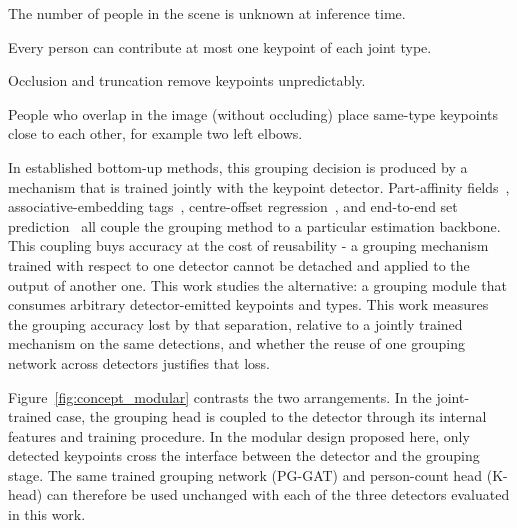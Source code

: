 \begin{compactitem}
    \item The number of people in the scene is unknown at inference time.
    \item Every person can contribute at most one keypoint of each joint type.
    \item Occlusion and truncation remove keypoints unpredictably.
    \item People who overlap in the image (without occluding) place same-type keypoints
    close to each other, for example two left elbows.
\end{compactitem}

In established bottom-up methods, this grouping decision is produced by a mechanism
that is trained jointly with the keypoint detector. Part-affinity fields~\cite{cao2017openpose},
associative-embedding tags~\cite{newell2017associative, cheng2020higherhrnet},
centre-offset regression~\cite{geng2021dekr},
and end-to-end set prediction~\cite{shi2022petr} all couple the grouping method
to a particular estimation backbone. This coupling buys accuracy
at the cost of reusability - a grouping mechanism trained with respect to one detector
cannot be detached and applied to the output of another one. This work studies the alternative:
a grouping module that consumes arbitrary detector-emitted keypoints and types.
This work measures the grouping accuracy lost by that separation,
relative to a jointly trained mechanism on the same detections,
and whether the reuse of one grouping network across detectors justifies that loss.

Figure~\ref{fig:concept_modular} contrasts the two arrangements.
In the joint-trained case,
the grouping head is coupled to the detector through its internal features and training procedure.
In the modular design proposed here,
only detected keypoints cross the interface between the detector and the grouping stage.
The same trained grouping network (PG-GAT) and person-count head (K-head)
can therefore be used unchanged with each of the three detectors evaluated in this
work.

